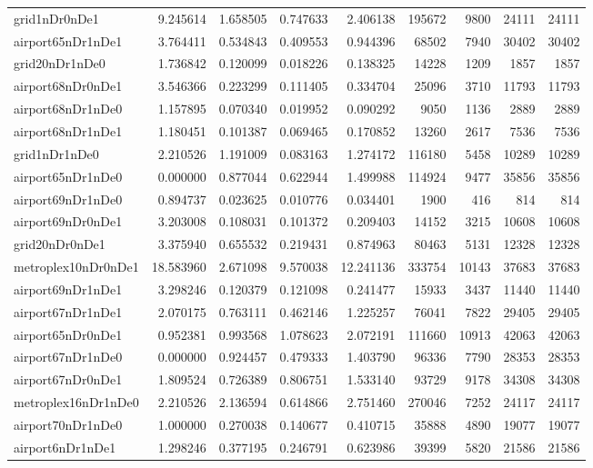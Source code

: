\begin{longtable}{|l|r|r|r|r|r|r|r|r|}
grid1nDr0nDe1 & 9.245614 & 1.658505 & 0.747633 & 2.406138 & 195672 & 9800 & 24111 & 24111 \\
airport65nDr1nDe1 & 3.764411 & 0.534843 & 0.409553 & 0.944396 & 68502 & 7940 & 30402 & 30402 \\
grid20nDr1nDe0 & 1.736842 & 0.120099 & 0.018226 & 0.138325 & 14228 & 1209 & 1857 & 1857 \\
airport68nDr0nDe1 & 3.546366 & 0.223299 & 0.111405 & 0.334704 & 25096 & 3710 & 11793 & 11793 \\
airport68nDr1nDe0 & 1.157895 & 0.070340 & 0.019952 & 0.090292 & 9050 & 1136 & 2889 & 2889 \\
airport68nDr1nDe1 & 1.180451 & 0.101387 & 0.069465 & 0.170852 & 13260 & 2617 & 7536 & 7536 \\
grid1nDr1nDe0 & 2.210526 & 1.191009 & 0.083163 & 1.274172 & 116180 & 5458 & 10289 & 10289 \\
airport65nDr1nDe0 & 0.000000 & 0.877044 & 0.622944 & 1.499988 & 114924 & 9477 & 35856 & 35856 \\
airport69nDr1nDe0 & 0.894737 & 0.023625 & 0.010776 & 0.034401 & 1900 & 416 & 814 & 814 \\
airport69nDr0nDe1 & 3.203008 & 0.108031 & 0.101372 & 0.209403 & 14152 & 3215 & 10608 & 10608 \\
grid20nDr0nDe1 & 3.375940 & 0.655532 & 0.219431 & 0.874963 & 80463 & 5131 & 12328 & 12328 \\
metroplex10nDr0nDe1 & 18.583960 & 2.671098 & 9.570038 & 12.241136 & 333754 & 10143 & 37683 & 37683 \\
airport69nDr1nDe1 & 3.298246 & 0.120379 & 0.121098 & 0.241477 & 15933 & 3437 & 11440 & 11440 \\
airport67nDr1nDe1 & 2.070175 & 0.763111 & 0.462146 & 1.225257 & 76041 & 7822 & 29405 & 29405 \\
airport65nDr0nDe1 & 0.952381 & 0.993568 & 1.078623 & 2.072191 & 111660 & 10913 & 42063 & 42063 \\
airport67nDr1nDe0 & 0.000000 & 0.924457 & 0.479333 & 1.403790 & 96336 & 7790 & 28353 & 28353 \\
airport67nDr0nDe1 & 1.809524 & 0.726389 & 0.806751 & 1.533140 & 93729 & 9178 & 34308 & 34308 \\
metroplex16nDr1nDe0 & 2.210526 & 2.136594 & 0.614866 & 2.751460 & 270046 & 7252 & 24117 & 24117 \\
airport70nDr1nDe0 & 1.000000 & 0.270038 & 0.140677 & 0.410715 & 35888 & 4890 & 19077 & 19077 \\
airport6nDr1nDe1 & 1.298246 & 0.377195 & 0.246791 & 0.623986 & 39399 & 5820 & 21586 & 21586 \\

\end{longtable}
